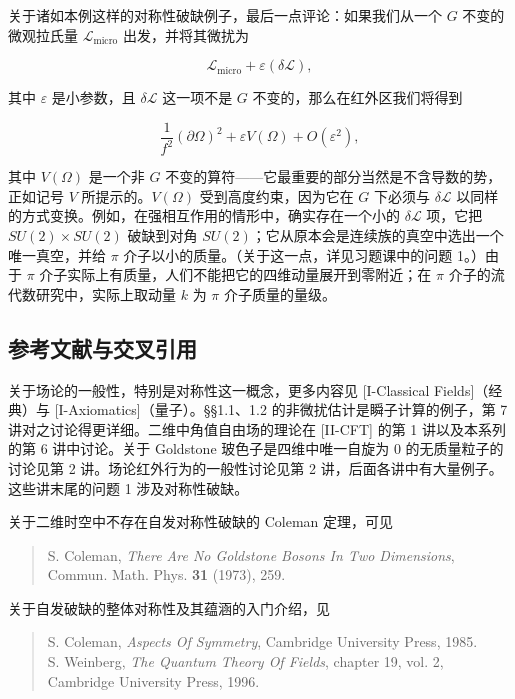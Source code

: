 关于诸如本例这样的对称性破缺例子，最后一点评论：如果我们从一个 $G$ 不变的微观拉氏量 $\mathcal{L}_{\mathrm{micro}}$ 出发，并将其微扰为

\[
  \mathcal{L}_{\mathrm{micro}}+\varepsilon(\delta\mathcal{L}),
\]

其中 $\varepsilon$ 是小参数，且 $\delta\mathcal{L}$ 这一项不是 $G$ 不变的，那么在红外区我们将得到

\[
  \frac1{f^2}(\partial\Omega)^2+\varepsilon V(\Omega)+O(\varepsilon^2),
\]

其中 $V(\Omega)$ 是一个非 $G$ 不变的算符——它最重要的部分当然是不含导数的势，正如记号 $V$ 所提示的。$V(\Omega)$ 受到高度约束，因为它在 $G$ 下必须与 $\delta\mathcal{L}$ 以同样的方式变换。例如，在强相互作用的情形中，确实存在一个小的 $\delta\mathcal{L}$ 项，它把 $SU(2)\times SU(2)$ 破缺到对角 $SU(2)$；它从原本会是连续族的真空中选出一个唯一真空，并给 $\pi$ 介子以小的质量。（关于这一点，详见习题课中的问题 1。）由于 $\pi$ 介子实际上有质量，人们不能把它的四维动量展开到零附近；在 $\pi$ 介子的流代数研究中，实际上取动量 $k$ 为 $\pi$ 介子质量的量级。

\subsection*{参考文献与交叉引用}

关于场论的一般性，特别是对称性这一概念，更多内容见 [I-Classical Fields]（经典）与 [I-Axiomatics]（量子）。§§1.1、1.2 的非微扰估计是瞬子计算的例子，第 7 讲对之讨论得更详细。二维中角值自由场的理论在 [II-CFT] 的第 1 讲以及本系列的第 6 讲中讨论。关于 Goldstone 玻色子是四维中唯一自旋为 $0$ 的无质量粒子的讨论见第 2 讲。场论红外行为的一般性讨论见第 2 讲，后面各讲中有大量例子。这些讲末尾的问题 1 涉及对称性破缺。


关于二维时空中不存在自发对称性破缺的 Coleman 定理，可见

\begin{quote}
S. Coleman, \emph{There Are No Goldstone Bosons In Two Dimensions}, Commun. Math. Phys. \textbf{31} (1973), 259.
\end{quote}

关于自发破缺的整体对称性及其蕴涵的入门介绍，见

\begin{quote}
S. Coleman, \emph{Aspects Of Symmetry}, Cambridge University Press, 1985.\\
S. Weinberg, \emph{The Quantum Theory Of Fields}, chapter 19, vol. 2, Cambridge University Press, 1996.
\end{quote}
